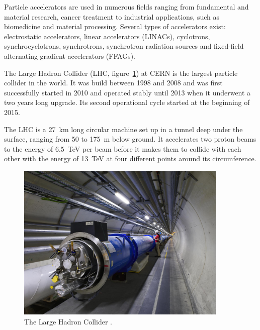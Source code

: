 Particle accelerators are used in numerous fields ranging from fundamental and material research, cancer treatment to industrial applications, such as biomedicine and material processing. Several types of accelerators exist: electrostatic accelerators, linear accelerators (LINACs), cyclotrons, synchrocyclotrons, synchrotrons, synchrotron radiation sources and fixed-field alternating gradient accelerators (FFAGs).

The Large Hadron Collider (LHC, figure~\ref{fig:lhc}) at CERN is the largest particle collider in the world. It was build between 1998 and 2008 and was first successfully started in 2010 and operated stably until 2013 when it underwent a two years long upgrade. Its second operational cycle started at the beginning of 2015.

The LHC is a 27~km long circular machine set up in a tunnel deep under the surface, ranging from 50 to 175~m below ground. It accelerates two proton beams to the energy of 6.5~TeV per beam before it makes them to collide with each other with the energy of 13~TeV at four different points around its circumference. 
\begin{figure}[!t]
\centering
\includegraphics[width=0.9\textwidth]{01_introduction/pics/lhc}
\caption{The Large Hadron Collider \cite{Maximilien:1324852}.}
\label{fig:lhc}
\end{figure}
